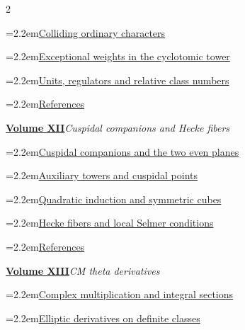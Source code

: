 \documentclass[a4paper,11pt]{article}
\theoremstyle{definition}
\theoremstyle{remark}
\numberwithin{equation}{section}
\begin{document}
\begin{multicols}{2}
\begin{minipage}{\linewidth}
\noindent\hangindent=2.2em\hyperref[nav:chapter-coincident-characters]{Colliding ordinary characters}\par
\noindent\hangindent=2.2em\hyperref[nav:chapter-dyadic-exceptional-weights]{Exceptional weights in the cyclotomic tower}\par
\noindent\hangindent=2.2em\hyperref[nav:chapter-dyadic-units-regulators]{Units, regulators and relative class numbers}\par
\noindent\hangindent=2.2em\hyperref[nav:bibliography-XI]{References}\par
\end{minipage}\par\medskip
\noindent\begin{minipage}{\linewidth}\raggedright
\textbf{\hyperref[nav:volume-XII]{Volume XII}}\enspace\emph{Cuspidal companions and Hecke fibers}\par\smallskip
\noindent\hangindent=2.2em\hyperref[nav:chapter-companions-even-planes]{Cuspidal companions and the two even planes}\par
\noindent\hangindent=2.2em\hyperref[nav:chapter-towers-cuspidal-points]{Auxiliary towers and cuspidal points}\par
\noindent\hangindent=2.2em\hyperref[nav:chapter-quadratic-induction-symmetric-cubes]{Quadratic induction and symmetric cubes}\par
\noindent\hangindent=2.2em\hyperref[nav:chapter-ordinary-hecke-fibers]{Hecke fibers and local Selmer conditions}\par
\noindent\hangindent=2.2em\hyperref[nav:bibliography-XII]{References}\par
\end{minipage}\par\medskip
\noindent\begin{minipage}{\linewidth}\raggedright
\textbf{\hyperref[nav:volume-XIII]{Volume XIII}}\enspace\emph{CM theta derivatives}\par\smallskip
\noindent\hangindent=2.2em\hyperref[nav:g-V-0]{Complex multiplication and integral sections}\par
\noindent\hangindent=2.2em\hyperref[nav:g-V-1]{Elliptic derivatives on definite classes}\par

\end{minipage}
\end{multicols}
\end{document}
